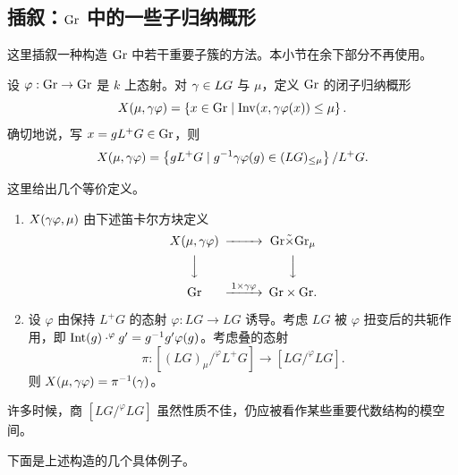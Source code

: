 
\subsection{插叙：${\operatorname{Gr}}$ 中的一些子归纳概形}\label{digression}

这里插叙一种构造 ${\operatorname{Gr}}$ 中若干重要子簇的方法。本小节在余下部分不再使用。

设 $\varphi: {\operatorname{Gr}}\to {\operatorname{Gr}}$ 是 $k$ 上态射。对 ${\gamma}\in LG$ 与 $\mu$，定义 ${\operatorname{Gr}}$ 的闭子归纳概形
\[X(\mu,{\gamma}\varphi)=\left\{ x\in {\operatorname{Gr}}\mid {\operatorname{Inv}}(x,{\gamma}\varphi(x))\leq \mu\right\}.\]
确切地说，写 $x=g L^+G\in {\operatorname{Gr}}$，则
\[X(\mu,{\gamma}\varphi)= \left\{g L^+G\mid g^{-1}{\gamma}\varphi(g) \in (LG)_{\leq \mu}\right\}/L^+G.\]

这里给出几个等价定义。

\begin{enumerate}
\item[(1)] $X({\gamma}\varphi,\mu)$ 由下述笛卡尔方块定义
\[\begin{CD}
X(\mu,\ga\varphi)@>>> \Gr\tilde\times\Gr_\mu\\
@VVV@VVV\\
\Gr@>1\times \ga\varphi>> \Gr\times \Gr.
\end{CD}\]

\item[(2)] 设 $\varphi$ 由保持 $L^+G$ 的态射 $\varphi:LG\to LG$ 诱导。考虑 $LG$ 被 $\varphi$ 扭变后的共轭作用，即 $\operatorname{Int}(g)\cdot^\varphi g'= g^{-1}g' \varphi(g)$。考虑叠的态射
\[\pi: [(LG)_\mu/^\varphi L^+G]\to [LG/^\varphi LG].\]
则 $X(\mu,{\gamma}\varphi)= \pi^{-1}({\gamma})$。
\end{enumerate}

\begin{rmk}
许多时候，商 $[LG/^\varphi LG]$ 虽然性质不佳，仍应被看作某些重要代数结构的模空间。
\end{rmk}

下面是上述构造的几个具体例子。


